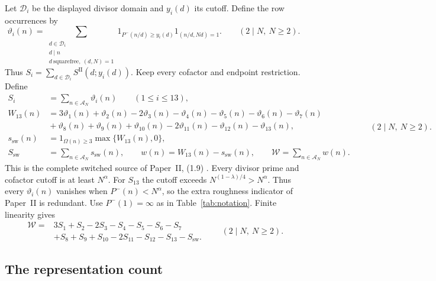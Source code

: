 Let \(\mathcal D_i\) be the displayed divisor domain and \(y_i(d)\) its cutoff.
Define the row occurrences by
\begin{equation}\label{eq:source-row-occurrences}
 \vartheta_i(n)=\sum_{\substack{d\in\mathcal D_i\\d\mid n\\
                  d\ \mathrm{squarefree},\ (d,N)=1}}
  1_{P^-(n/d)\ge y_i(d)}1_{(n/d,Nd)=1}.
\qquad(2\mid N,\ N\ge2).
\end{equation}
Thus \(S_i=\sum_{d\in\mathcal D_i}S^{\mathrm{II}}(d;y_i(d))\).
Keep every cofactor and endpoint restriction. Define
\begin{equation}\label{eq:source-thirteen}
\begin{aligned}
 S_i&=\sum_{n\in\mathcal A_N}\vartheta_i(n)\qquad(1\le i\le13),\\
 W_{13}(n)&=3\vartheta_1(n)+\vartheta_2(n)-2\vartheta_3(n)
 -\vartheta_4(n)-\vartheta_5(n)-\vartheta_6(n)-\vartheta_7(n)\\
 &{}+\vartheta_8(n)+\vartheta_9(n)+\vartheta_{10}(n)
 -2\vartheta_{11}(n)-\vartheta_{12}(n)-\vartheta_{13}(n),\\
 s_{\mathrm{sw}}(n)&=1_{\Omega(n)\ge3}\max\{W_{13}(n),0\},\\
 S_{\mathrm{sw}}&=\sum_{n\in\mathcal A_N}s_{\mathrm{sw}}(n),\qquad
 w(n)=W_{13}(n)-s_{\mathrm{sw}}(n),\qquad
 \mathcal W=\sum_{n\in\mathcal A_N}w(n).
\end{aligned}
\qquad(2\mid N,\ N\ge2).
\end{equation}
This is the complete switched source of Paper~II, (1.9)
\cite[(1.9)]{PaperII}.
Every divisor prime and cofactor cutoff is at least $N^\alpha$.
For $S_{13}$ the cutoff exceeds $N^{(1-\lambda)/4}>N^\alpha$.
Thus every $\vartheta_i(n)$ vanishes when $P^-(n)<N^\alpha$,
so the extra roughness indicator of Paper~II is redundant.
Use $P^-(1)=\infty$ as in Table~\ref{tab:notation}.
Finite linearity gives
\begin{equation}\label{eq:source-weight-identity}
\begin{aligned}
 \mathcal W={}&3S_1+S_2-2S_3-S_4-S_5-S_6-S_7\\
 &+S_8+S_9+S_{10}-2S_{11}-S_{12}-S_{13}-S_{\mathrm{sw}}.
\end{aligned}
\qquad(2\mid N,\ N\ge2).
\end{equation}


\subsection{The representation count}

